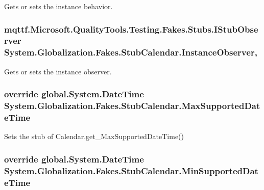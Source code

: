 Gets or sets the instance behavior.

\hypertarget{class_system_1_1_globalization_1_1_fakes_1_1_stub_calendar_aa1d91bf8cfd679fd05f66cdaedec04cd}{
\subsubsection[{Instance\-Observer}]{\setlength{\rightskip}{0pt plus 5cm}mqttf.\-Microsoft.\-Quality\-Tools.\-Testing.\-Fakes.\-Stubs.\-I\-Stub\-Observer System.\-Globalization.\-Fakes.\-Stub\-Calendar.\-Instance\-Observer\hspace{0.3cm}{\ttfamily [get]}, {\ttfamily [set]}}}\label{class_system_1_1_globalization_1_1_fakes_1_1_stub_calendar_aa1d91bf8cfd679fd05f66cdaedec04cd}


Gets or sets the instance observer.

\hypertarget{class_system_1_1_globalization_1_1_fakes_1_1_stub_calendar_a526401ab9862cd7a521f8493717eaa71}{
\subsubsection[{Max\-Supported\-Date\-Time}]{\setlength{\rightskip}{0pt plus 5cm}override global.\-System.\-Date\-Time System.\-Globalization.\-Fakes.\-Stub\-Calendar.\-Max\-Supported\-Date\-Time\hspace{0.3cm}{\ttfamily [get]}}}\label{class_system_1_1_globalization_1_1_fakes_1_1_stub_calendar_a526401ab9862cd7a521f8493717eaa71}


Sets the stub of Calendar.\-get\-\_\-\-Max\-Supported\-Date\-Time()

\hypertarget{class_system_1_1_globalization_1_1_fakes_1_1_stub_calendar_af1e0365596225cf49004e95fea565476}{
\subsubsection[{Min\-Supported\-Date\-Time}]{\setlength{\rightskip}{0pt plus 5cm}override global.\-System.\-Date\-Time System.\-Globalization.\-Fakes.\-Stub\-Calendar.\-Min\-Supported\-Date\-Time\hspace{0.3cm}{\ttfamily [get]}}}\label{class_system_1_1_globalization_1_1_fakes_1_1_stub_calendar_af1e0365596225cf49004e95fea565476}


